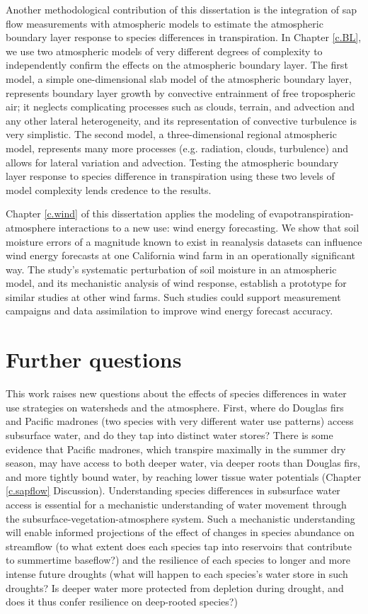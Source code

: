 Another methodological contribution of this dissertation is the integration of sap flow measurements with atmospheric models to estimate the atmospheric boundary layer response to species differences in transpiration.  In Chapter \ref{c.BL}, we use two atmospheric models of very different degrees of complexity to independently confirm the effects on the atmospheric boundary layer.  The first model, a simple one-dimensional slab model of the atmospheric boundary layer, represents boundary layer growth by convective entrainment of free tropospheric air; it neglects complicating processes such as clouds, terrain, and advection and any other lateral heterogeneity, and its representation of convective turbulence is very simplistic.  The second model, a three-dimensional regional atmospheric model, represents many more processes (e.g. radiation, clouds, turbulence) and allows for lateral variation and advection.  Testing the atmospheric boundary layer response to species difference in transpiration using these two levels of model complexity lends credence to the results.

Chapter \ref{c.wind} of this dissertation applies the modeling of evapotranspiration-atmosphere interactions to a new use: wind energy forecasting.  We show that soil moisture errors of a magnitude known to exist in reanalysis datasets can influence wind energy forecasts at one California wind farm in an operationally significant way.  The study's systematic perturbation of soil moisture in an atmospheric model, and its mechanistic analysis of wind response, establish a prototype for similar studies at other wind farms.  Such studies could support measurement campaigns and data assimilation to improve wind energy forecast accuracy.

\section{Further questions}

This work raises new questions about the effects of species differences in water use strategies on watersheds and the atmosphere.  First, where do Douglas firs and Pacific madrones (two species with very different water use patterns) access subsurface water, and do they tap into distinct water stores?  There is some evidence that Pacific madrones, which transpire maximally in the summer dry season, may have access to both deeper water, via deeper roots than Douglas firs, and more tightly bound water, by reaching lower tissue water potentials (Chapter \ref{c.sapflow} Discussion).  Understanding species differences in subsurface water access is essential for a mechanistic understanding of water movement through the subsurface-vegetation-atmosphere system.  Such a mechanistic understanding will enable informed projections of the effect of changes in species abundance on streamflow (to what extent does each species tap into reservoirs that contribute to summertime baseflow?) and the resilience of each species to longer and more intense future droughts (what will happen to each species's water store in such droughts?  Is deeper water more protected from depletion during drought, and does it thus confer resilience on deep-rooted species?)

